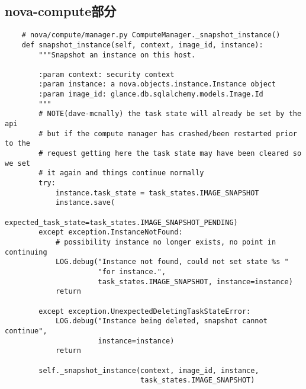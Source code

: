 \documentclass[a4paper,left=1.5cm,right=1.5cm,11pt]{article}
\begin{document}
\subsection{nova-compute部分}
    \begin{lstlisting}
    # nova/compute/manager.py ComputeManager._snapshot_instance()
    def snapshot_instance(self, context, image_id, instance):
        """Snapshot an instance on this host.

        :param context: security context
        :param instance: a nova.objects.instance.Instance object
        :param image_id: glance.db.sqlalchemy.models.Image.Id
        """
        # NOTE(dave-mcnally) the task state will already be set by the api
        # but if the compute manager has crashed/been restarted prior to the
        # request getting here the task state may have been cleared so we set
        # it again and things continue normally
        try:
            instance.task_state = task_states.IMAGE_SNAPSHOT
            instance.save(
                        expected_task_state=task_states.IMAGE_SNAPSHOT_PENDING)
        except exception.InstanceNotFound:
            # possibility instance no longer exists, no point in continuing
            LOG.debug("Instance not found, could not set state %s "
                      "for instance.",
                      task_states.IMAGE_SNAPSHOT, instance=instance)
            return

        except exception.UnexpectedDeletingTaskStateError:
            LOG.debug("Instance being deleted, snapshot cannot continue",
                      instance=instance)
            return

        self._snapshot_instance(context, image_id, instance,
                                task_states.IMAGE_SNAPSHOT)
    \end{lstlisting}
\end{document}

